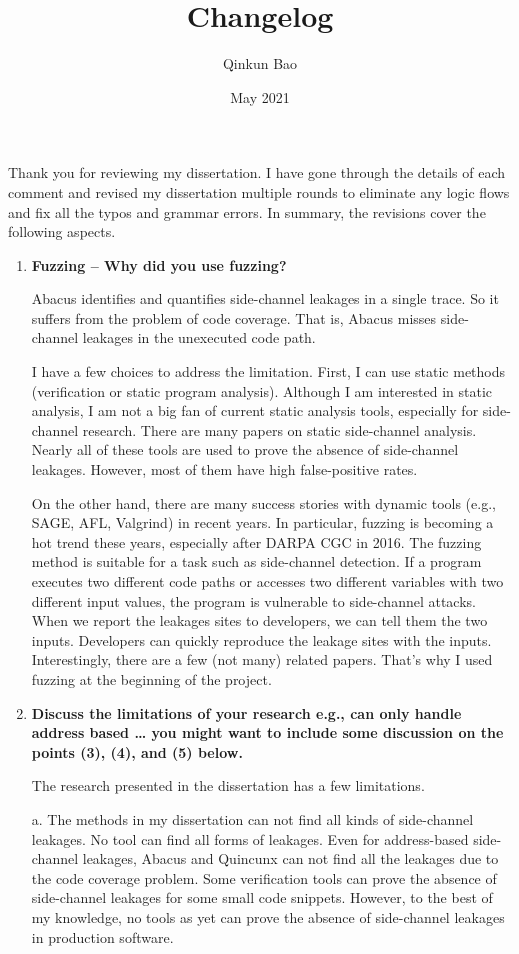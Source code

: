 \documentclass{article}
\title{Changelog}
\author{Qinkun Bao}
\date{May 2021}
\begin{document}
\maketitle
Thank you for reviewing my dissertation. I have gone through the details of each comment and revised my dissertation multiple rounds to eliminate any logic flows and fix all the typos and grammar errors. In summary, the revisions cover the following aspects.


\begin{enumerate}
\item \textbf{Fuzzing – Why did you use fuzzing?}

Abacus identifies and quantifies side-channel leakages in a single trace. So it suffers from the problem of code coverage.  That is, Abacus misses side-channel leakages in the unexecuted code path. 

I have a few choices to address the limitation. First, I can use static methods (verification or static program analysis). Although I am interested in static analysis, I am not a big fan of current static analysis tools, especially for side-channel research. There are many papers on static side-channel analysis. Nearly all of these tools are used to prove the absence of side-channel leakages. However, most of them have high false-positive rates. 

On the other hand, there are many success stories with dynamic tools (e.g., SAGE, AFL, Valgrind) in recent years. In particular, fuzzing is becoming a hot trend these years, especially after DARPA CGC in 2016. The fuzzing method is suitable for a task such as side-channel detection. If a program executes two different code paths or accesses two different variables with two different input values, the program is vulnerable to side-channel attacks. When we report the leakages sites to developers, we can tell them the two inputs. Developers can quickly reproduce the leakage sites with the inputs.  Interestingly, there are a few (not many) related papers. That's why I used fuzzing at the beginning of the project.


\item \textbf{Discuss the limitations of your research
e.g., can only handle address based …
you might want to include some discussion on the points (3), (4), and (5) below.}

The research presented in the dissertation has a few limitations.

a. The methods in my dissertation can not find all kinds of side-channel leakages. No tool can find all forms of leakages. Even for address-based side-channel leakages, Abacus and Quincunx can not find all the leakages due to the code coverage problem. Some verification tools can prove the absence of side-channel leakages for some small code snippets. However, to the best of my knowledge, no tools as yet can prove the absence of side-channel leakages in production software.


\end{enumerate}
\end{document}
